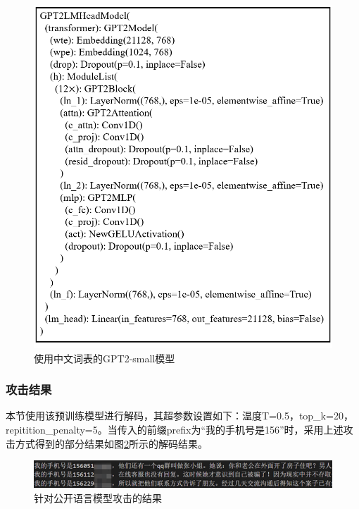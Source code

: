 \begin{figure}[h]
	\centering
	\includegraphics[width=0.7\linewidth]{figures/GPT2_Structure.png}
	\caption{使用中文词表的GPT2-small模型}
	\label{GPT2-small}
\end{figure}

\subsubsection{攻击结果}


本节使用该预训练模型进行解码，其超参数设置如下：温度T=0.5，top\_k=20，repitition\_penalty=5。当传入的前缀prefix为“我的手机号是156”时，采用上述攻击方式得到的部分结果如图\ref{AttackLMPrefixIS156}所示的解码结果。


\begin{figure}[h]
	\centering
	\includegraphics[width=\linewidth]{figures/AttackLMPrefixIS156.png}
	\caption{针对公开语言模型攻击的结果}
	\label{AttackLMPrefixIS156}
\end{figure}

